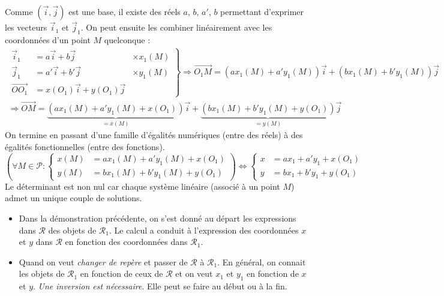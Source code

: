 \begin{demo}
 Comme $(\overrightarrow i , \overrightarrow j)$ est une base, il existe des réels $a$, $b$, $a'$, $b$ permettant d'exprimer les vecteurs $\overrightarrow i_1$ et $\overrightarrow j_1$. On peut ensuite les combiner linéairement avec les coordonnées d'un point $M$ quelconque :
\begin{multline*} 
\left. 
 \begin{aligned}
  \overrightarrow i_1 &= a\overrightarrow i + b \overrightarrow j &\times x_1(M)\\
  \overrightarrow j_1 &= a'\overrightarrow i + b' \overrightarrow j &\times y_1(M)\\
  \overrightarrow{OO_1}&=x(O_1)\overrightarrow i +y(O_1)\overrightarrow j &
 \end{aligned}
\right\rbrace 
\Rightarrow
\overrightarrow{O_1M}
= \left(ax_1(M)+a'y_1(M) \right)\overrightarrow i +
  \left(bx_1(M)+b'y_1(M) \right)\overrightarrow j  
\\
\Rightarrow
\overrightarrow{OM}
= \underset{= x(M)}{\underbrace{\left(ax_1(M)+a'y_1(M) +x(O_1)\right)}}\overrightarrow i +
  \underset{ = y(M)}{\underbrace{\left(bx_1(M)+b'y_1(M) +y(O_1)\right)}}\overrightarrow j  
\end{multline*}
On termine en passant d'une famille d'égalités numériques (entre des réels) à des égalités fonctionnelles (entre des fonctions).
\begin{displaymath}
\left(
\forall M\in \mathcal{P} :
\left\lbrace 
\begin{aligned}
 x(M) &= ax_1(M)+a'y_1(M) +x(O_1)\\
 y(M) &= bx_1(M)+b'y_1(M) +y(O_1)
\end{aligned} \right. 
\right) 
\Leftrightarrow
\left\lbrace 
\begin{aligned}
 x &= ax_1 + a'y_1 +x(O_1)\\
 y &= bx_1+b'y_1 +y(O_1)
\end{aligned} \right. 
\end{displaymath}
Le déterminant est non nul car chaque système linéaire (associé à un point $M$) admet un unique couple de solutions.
\end{demo}
\begin{rem}
\begin{itemize}
 \item Dans la démonstration précédente, on s'est donné au départ les expressions dans $\mathcal{R}$ des objets de $\mathcal{R}_1$. Le calcul a conduit à l'expression des coordonnées $x$ et $y$ dans $\mathcal{R}$ en fonction des coordonnées dans $\mathcal{R}_1$.
 \item Quand on veut \emph{changer de repère} et passer de $\mathcal{R}$ à $\mathcal{R}_1$. En général, on connait les objets de $\mathcal{R}_1$ en fonction de ceux de $\mathcal{R}$ et on veut $x_1$ et $y_1$ en fonction de $x$ et $y$. \emph{Une inversion est nécessaire}. Elle peut se faire au début ou à la fin. 
\end{itemize}
\end{rem}
